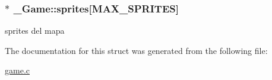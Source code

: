 \subsubsection[{\texorpdfstring{sprites}{sprites}}]{$\ast$ \+\_\+\+Game\+::sprites\mbox{[}{\bf M\+A\+X\+\_\+\+S\+P\+R\+I\+T\+ES}\mbox{]}}\hypertarget{struct__Game_a457e4328c3dfd137ba4407ad8e041cf2}{}\label{struct__Game_a457e4328c3dfd137ba4407ad8e041cf2}
sprites del mapa 

The documentation for this struct was generated from the following file\+:\begin{DoxyCompactItemize}
\item 
\hyperlink{game_8c}{game.\+c}\end{DoxyCompactItemize}
